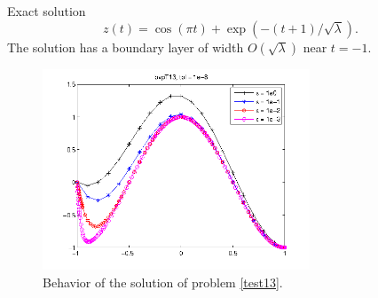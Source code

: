 \documentclass[<options>]{article}
\begin{document}
\textrm{Exact solution}
$$z(t) = \cos(\pi t) +  \exp(-(t + 1) / \sqrt\lambda).$$
The solution has a boundary layer of width $O(\sqrt\lambda)$ near $t = -1.$

\begin{figure}[htb]
\centerline{\includegraphics[height=6cm]{Prob13}}
\caption{Behavior of the solution of problem \ref{test13}.}
\end{figure}
 \newpage
\end{document}

